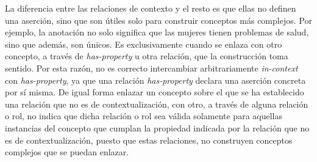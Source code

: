 La diferencia entre las relaciones de contexto y el resto es que ellas no definen una aserción, sino que son útiles solo para construir conceptos más complejos. Por ejemplo, la anotación  no solo significa que las mujeres tienen problemas de salud, sino que además, son únicos. Es exclusivamente cuando se enlaza con otro concepto, a través de \textit{has-property} u otra relación, que la construcción toma sentido. Por esta razón, no es correcto intercambiar arbitrariamente \textit{in-context} con \textit{has-property}, ya que una relación \textit{has-property} declara una aserción concreta por sí misma. De igual forma enlazar un concepto sobre el que se ha establecido una relación que no es de contextualización, con otro, a través de alguna relación o rol, no indica que dicha relación o rol sea válida solamente para aquellas instancias del concepto que cumplan la propiedad indicada por la relación que no es de contextualización, puesto que estas relaciones, no construyen conceptos complejos que se puedan enlazar.

